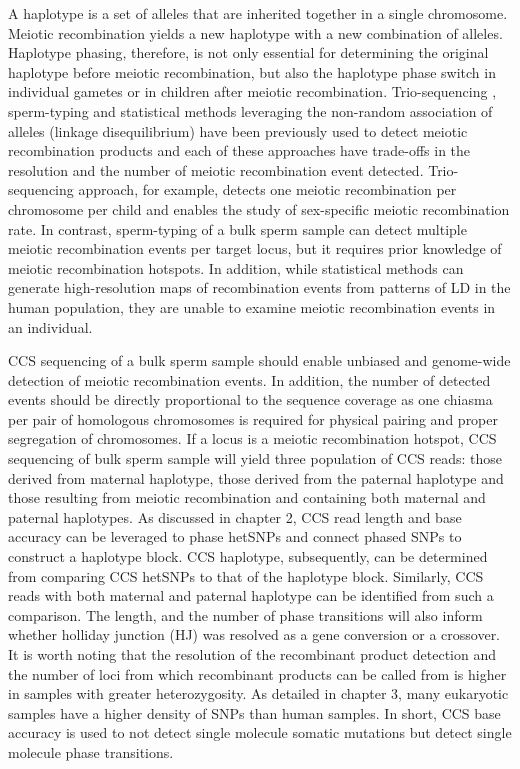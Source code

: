 A haplotype is a set of alleles that are inherited together in a single chromosome. Meiotic recombination yields a new haplotype with a new combination of alleles. Haplotype phasing, therefore, is not only essential for determining the original haplotype before meiotic recombination, but also the haplotype phase switch in individual gametes or in children after meiotic recombination. Trio-sequencing \cite{Kong2010-uk}, sperm-typing \cite{Webb2008-pw} and statistical methods leveraging the non-random association of alleles (linkage disequilibrium) \cite{Myers2005-ml} have been previously used to detect meiotic recombination products and each of these approaches have trade-offs in the resolution and the number of meiotic recombination event detected. Trio-sequencing approach, for example, detects one meiotic recombination per chromosome per child and enables the study of sex-specific meiotic recombination rate. In contrast, sperm-typing of a bulk sperm sample can detect multiple meiotic recombination events per target locus, but it requires prior knowledge of meiotic recombination hotspots. In addition, while statistical methods can generate high-resolution maps of recombination events from patterns of LD in the human population, they are unable to examine meiotic recombination events in an individual.

CCS sequencing of a bulk sperm sample should enable unbiased and genome-wide detection of meiotic recombination events. In addition, the number of detected events should be directly proportional to the sequence coverage as one chiasma per pair of homologous chromosomes is required for physical pairing and proper segregation of chromosomes. If a locus is a meiotic recombination hotspot, CCS sequencing of bulk sperm sample will yield three population of CCS reads: those derived from maternal haplotype, those derived from the paternal haplotype and those resulting from meiotic recombination and containing both maternal and paternal haplotypes. As discussed in chapter 2, CCS read length and base accuracy can be leveraged to phase hetSNPs and connect phased SNPs to construct a haplotype block. CCS haplotype, subsequently, can be determined from comparing CCS hetSNPs to that of the haplotype block. Similarly, CCS reads with both maternal and paternal haplotype can be identified from such a comparison. The length, and the number of phase transitions will also inform whether holliday junction (HJ) was resolved as a gene conversion or a crossover. It is worth noting that the resolution of the recombinant product detection and the number of loci from which recombinant products can be called from is higher in samples with greater heterozygosity. As detailed in chapter 3, many eukaryotic samples have a higher density of SNPs than human samples. In short, CCS base accuracy is used to not detect single molecule somatic mutations but detect single molecule phase transitions.

